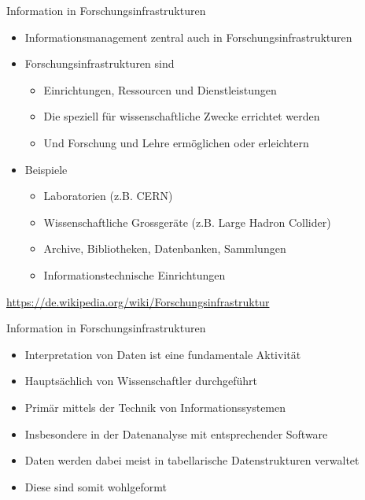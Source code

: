 \documentclass{beamer}
\begin{document}
\begin{frame}{Information in Forschungsinfrastrukturen}
	
	\begin{itemize}
		\item Informationsmanagement zentral auch in Forschungsinfrastrukturen
		\item Forschungsinfrastrukturen sind
		\begin{itemize}
			\item Einrichtungen, Ressourcen und Dienstleistungen
			\item Die speziell für wissenschaftliche Zwecke errichtet werden
			\item Und Forschung und Lehre ermöglichen oder erleichtern
		\end{itemize}
		\item Beispiele
		\begin{itemize}
			\item Laboratorien (z.B. CERN)
			\item Wissenschaftliche Grossgeräte (z.B. Large Hadron Collider)
			\item Archive, Bibliotheken, Datenbanken, Sammlungen
			\item Informationstechnische Einrichtungen
		\end{itemize}
	\end{itemize}
	
	\begin{flushright}
		\scriptsize\url{https://de.wikipedia.org/wiki/Forschungsinfrastruktur}
	\end{flushright}
	
\end{frame}

\begin{frame}{Information in Forschungsinfrastrukturen}
	
	\begin{itemize}
		\item Interpretation von Daten ist eine fundamentale Aktivität
		\item Hauptsächlich von Wissenschaftler durchgeführt
		\item Primär mittels der Technik von Informationssystemen
		\item Insbesondere in der Datenanalyse mit entsprechender Software
		\item Daten werden dabei meist in tabellarische Datenstrukturen verwaltet
		\item Diese sind somit wohlgeformt
	\end{itemize}
	
\end{frame}
\end{document}

